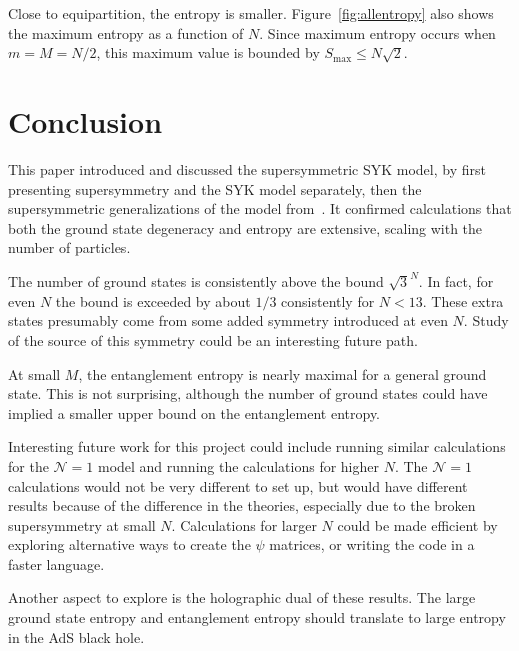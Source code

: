 \documentclass[12pt]{article} %
\renewcommand{\cal}{\mathcal}
\begin{document}
Close to equipartition, the entropy is smaller. Figure~\ref{fig:allentropy} also shows the maximum entropy as a function of $N$. Since maximum entropy occurs when $m = M = N/2$, this maximum value is bounded by $S_\text{max} \le N\sqrt{2}$.

\section{Conclusion} \label{sec:concl}

This paper introduced and discussed the supersymmetric SYK model, by first presenting supersymmetry and the SYK model separately, then the supersymmetric generalizations of the model from~\cite{fu16}. It confirmed calculations that both the ground state degeneracy and entropy are extensive, scaling with the number of particles. 

The number of ground states is consistently above the bound $\sqrt{3}^N$. In fact, for even $N$ the bound is exceeded by about $1/3$ consistently for $N<13$. These extra states presumably come from some added symmetry introduced at even $N$. Study of the source of this symmetry could be an interesting future path. 

At small $M$, the entanglement entropy is nearly maximal for a general ground state. This is not surprising, although the number of ground states could have implied a smaller upper bound on the entanglement entropy. 

Interesting future work for this project could include running similar calculations for the $\cal N=1$ model and running the calculations for higher $N$. The $\cal N=1$ calculations would not be very different to set up, but would have different results because of the difference in the theories, especially due to the broken supersymmetry at small $N$. Calculations for larger $N$ could be made efficient by exploring alternative ways to create the $\psi$ matrices, or writing the code in a faster language.

Another aspect to explore is the holographic dual of these results. The large ground state entropy and entanglement entropy should translate to large entropy in the AdS black hole.

\printbibliography
\end{document}
